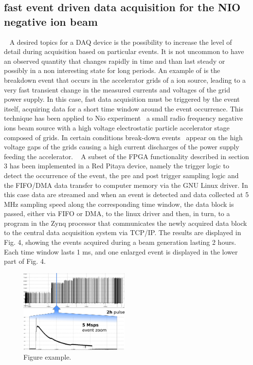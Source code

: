 \subsection{fast event driven data acquisition for the NIO negative ion beam}
~
A desired topics for a DAQ device is the possibility to increase the level of detail during acquisition based on particular events. It is not uncommon to have an observed quantity that changes rapidly in time and than last steady or possibly in a non interesting state for long periods. An example of is the breakdown event that occurs in the accelerator grids of a ion source, leading to a very fast transient change in the measured currents and voltages of the grid power supply. In this case, fast data acquisition must be triggered by the event itself, acquiring data for a short time window around the event occurrence. This technique has been applied to Nio experiment~\cite{DEMURI2015249} a small radio frequency negative ions beam source with a high voltage electrostatic particle accelerator stage composed of grids. In certain conditions break-down events~\cite{RECCHIA20111545} appear on the high voltage gaps of the grids causing a  high current discharges of the power supply feeding the accelerator. 
~
A subset of the FPGA functionality described in section 3 has been implemented in a Red Pitaya device, namely the trigger logic to detect the occurrence of the event, the pre and post trigger sampling logic and the FIFO/DMA data transfer to computer memory via the GNU Linux driver. In this case data are streamed and when an event is detected and data collected at 5 MHz sampling speed along the corresponding time window, the data block is passed, either via FIFO or DMA, to the linux driver and then, in turn, to a program in the Zynq processor that communicates the newly acquired data block to the central data acquisition system via TCP/IP. The results are displayed in Fig. 4, showing the events acquired during a beam generation lasting 2 hours. Each time window lasts 1 ms, and one enlarged event is  displayed in the lower part of Fig. 4.    
\begin{figure}
\centering
\includegraphics[width=0.49\textwidth]{img/4_EmbeddedML/nio12b.png}
\caption{Figure example.}
\label{fig:nio}
\end{figure}


